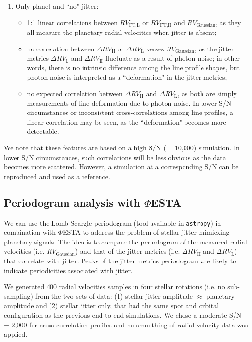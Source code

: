\begin{enumerate}[label=(\alph*)]
	\item Only planet and ``no" jitter:
	\begin{itemize}
		\item 1:1 linear correlations between $RV_\text{FT,L}$ or $RV_\text{FT,H}$ and $RV_\text{Gaussian}$, as they all measure the planetary radial velocities when jitter is absent;
		\item no correlation between $\Delta RV_\text{H}$ or $\Delta RV_\text{L}$ verses $RV_\text{Gaussian}$, as the jitter metrics $\Delta RV_\text{L}$ and $\Delta RV_\text{H}$ fluctuate as a result of photon noise; in other words, there is no intrinsic difference among the line profile shapes, but photon noise is interpreted as a ``deformation" in the jitter metrics;
		\item no expected correlation between $\Delta RV_\text{H}$ and $\Delta RV_\text{L}$, as both are simply measurements of line deformation due to photon noise. In lower S/N circumstances or inconsistent cross-correlations among line profiles, a linear correlation may be seen, as the ``deformation" becomes more detectable.  
	\end{itemize}	

\end{enumerate}

We note that these features are based on a high S/N (=~10,000) simulation. In lower S/N circumstances, such correlations will be less obvious as the data becomes more scattered. However, a simulation at a corresponding S/N can be reproduced and used as a reference. 


\subsection{Periodogram analysis with $\mathit{\Phi}$ESTA}

We can use the Lomb-Scargle periodogram (tool available in \verb|astropy|) in combination with $\mathit{\Phi}$ESTA to address the problem of stellar jitter mimicking planetary signals. The idea is to compare the periodogram of the measured radial velocities (i.e. $RV_\text{Gaussian}$) and that of the jitter metrics (i.e. $\Delta RV_\text{H}$ and $\Delta RV_\text{L}$) that correlate with jitter. Peaks of the jitter metrics periodogram are likely to indicate periodicities associated with jitter. 

We generated 400 radial velocities samples in four stellar rotations (i.e. no sub-sampling) from the two sets of data: (1) stellar jitter amplitude $\approx$ planetary amplitude and (2) stellar jitter only, that had the same spot and orbital configuration as the previous end-to-end simulations. We chose a moderate S/N = 2,000 for cross-correlation profiles and no smoothing of radial velocity data was applied. 

